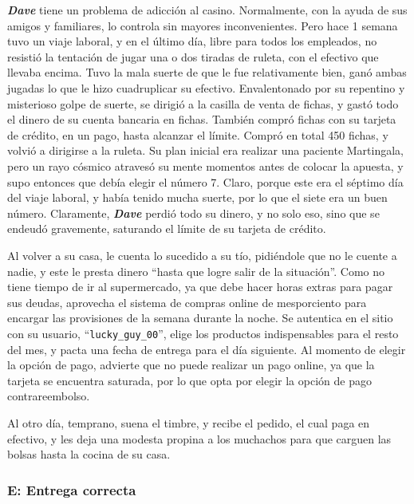 \textbf{\emph{Dave}} tiene un problema de adicción al casino. Normalmente, con
la ayuda de sus amigos y familiares, lo controla sin mayores inconvenientes.
Pero hace 1 semana tuvo un viaje laboral, y en el último día, libre para todos
los empleados, no resistió la tentación de jugar una o dos tiradas de ruleta,
con el efectivo que llevaba encima. Tuvo la mala suerte de que le fue
relativamente bien, ganó ambas jugadas lo que le hizo cuadruplicar su efectivo.
Envalentonado por su repentino y misterioso golpe de suerte, se dirigió a la
casilla de venta de fichas, y gastó todo el dinero de su cuenta bancaria en
fichas. También compró fichas con su tarjeta de crédito, en un pago, hasta
alcanzar el límite. Compró en total 450 fichas, y volvió a dirigirse a la
ruleta. Su plan inicial era realizar una paciente Martingala, pero un rayo
cósmico atravesó su mente momentos antes de colocar la apuesta, y supo entonces
que debía elegir el número 7. Claro, porque este era el séptimo día del viaje
laboral, y había tenido mucha suerte, por lo que el siete era un buen número.
Claramente, \textbf{\emph{Dave}} perdió todo su dinero, y no solo eso, sino que
se endeudó gravemente, saturando el límite de su tarjeta de crédito.

Al volver a su casa, le cuenta lo sucedido a su tío, pidiéndole que no le cuente
a nadie, y este le presta dinero ``hasta que logre salir de la situación''. Como
no tiene tiempo de ir al supermercado, ya que debe hacer horas extras para pagar
sus deudas, aprovecha el sistema de compras online de mesporciento para encargar
las provisiones de la semana durante la noche. Se autentica en el sitio con su
usuario, ``\texttt{lucky\_guy\_00}'', elige los productos indispensables para el
resto del mes, y pacta una fecha de entrega para el día siguiente. Al momento de
elegir la opción de pago, advierte que no puede realizar un pago online, ya que
la tarjeta se encuentra saturada, por lo que opta por elegir la opción de pago
contrareembolso.

Al otro día, temprano, suena el timbre, y recibe el pedido, el cual paga en
efectivo, y les deja una modesta propina a los muchachos para que carguen las
bolsas hasta la cocina de su casa.

\subsubsection{E: Entrega correcta}

